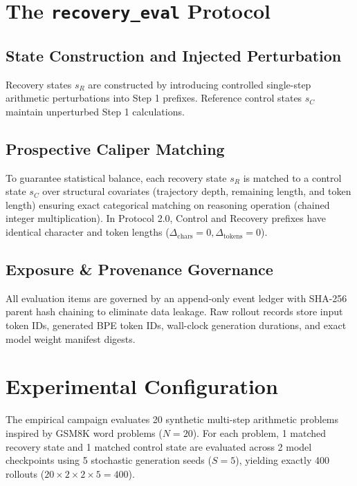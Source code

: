 \documentclass[10pt,conference]{IEEEtran}
\begin{document}
\section{The \texttt{recovery\_eval} Protocol}

\subsection{State Construction and Injected Perturbation}
Recovery states $s_R$ are constructed by introducing controlled single-step arithmetic perturbations into Step 1 prefixes. Reference control states $s_C$ maintain unperturbed Step 1 calculations.

\subsection{Prospective Caliper Matching}
To guarantee statistical balance, each recovery state $s_R$ is matched to a control state $s_C$ over structural covariates (trajectory depth, remaining length, and token length) ensuring exact categorical matching on reasoning operation (chained integer multiplication). In Protocol 2.0, Control and Recovery prefixes have identical character and token lengths ($\Delta_{\text{chars}} = 0, \Delta_{\text{tokens}} = 0$).

\subsection{Exposure \& Provenance Governance}
All evaluation items are governed by an append-only event ledger with SHA-256 parent hash chaining to eliminate data leakage. Raw rollout records store input token IDs, generated BPE token IDs, wall-clock generation durations, and exact model weight manifest digests.

\section{Experimental Configuration}
The empirical campaign evaluates 20 synthetic multi-step arithmetic problems inspired by GSM8K word problems ($N=20$). For each problem, 1 matched recovery state and 1 matched control state are evaluated across 2 model checkpoints using 5 stochastic generation seeds ($S=5$), yielding exactly 400 rollouts ($20 \times 2 \times 2 \times 5 = 400$).
\end{document}

